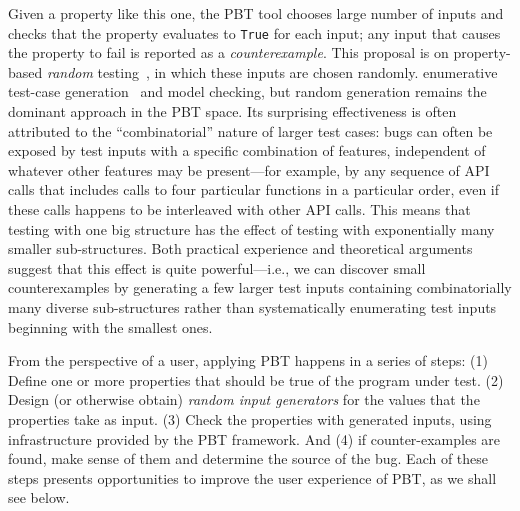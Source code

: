 Given a property like this one, the PBT tool chooses large number of inputs and
checks that the property evaluates to \lstinline{True} for each input; any input
that causes the property to fail is reported as a {\em counterexample}.  This
proposal is on property-based {\em random} testing~\cite{hamlet1994random}, in
which these inputs are chosen randomly.
 enumerative test-case generation~\cite[etc.]{DBLP:conf/haskell/RuncimanNL08, leancheck} and model
checking, but random generation remains the dominant approach in the PBT
space. Its surprising effectiveness is often attributed to the
``combinatorial'' nature of larger test cases: bugs can often be
exposed by test inputs with a specific combination of features,
independent of whatever other features may be present---for example,
by any sequence of API calls that includes calls to four particular
functions in a particular order, even if these calls happens to be
interleaved with other API calls.  This means that testing with one
big structure has the effect of testing with exponentially many
smaller sub-structures. Both practical experience and theoretical
arguments~\cite{goldstein2021dojudgeatest} suggest that this effect is quite
powerful---i.e., we can discover small counterexamples by generating
a few larger test inputs containing combinatorially many diverse
sub-structures rather than systematically enumerating test inputs
beginning with the smallest ones.

From the perspective of a user, applying PBT happens in a series of steps:
(1) Define one or more properties that should be true of the program under
  test.
(2) Design (or otherwise obtain) {\em random input generators} for the
  values that the properties take as input.
(3) Check the properties with generated inputs, using infrastructure
  provided by the PBT framework.
And (4) if counter-examples are found, make sense of them and determine the
  source of the bug.
Each of these steps presents opportunities to improve the user experience of
PBT, as we shall see below.

 

